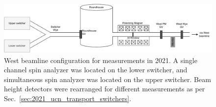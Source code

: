 \begin{figure}
    \centering
    \includegraphics[width=\textwidth]{figures/westbeamline_2021.pdf}
    \caption[West beamline configuration for measurements in 2021.]
    {West beamline configuration for measurements in 2021. A single channel spin analyzer was located on the lower switcher, and simultaneous spin analyzer was located on the upper switcher. Beam height detectors were rearranged for different measurements as per Sec.~\ref{sec:2021_ucn_transport_switchers}.}\label{fig:west_beamline_2021}
\end{figure}

